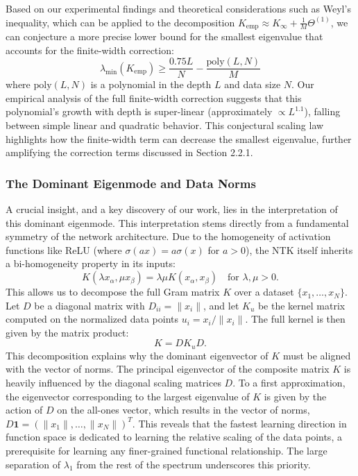 \documentclass{article}
\begin{document}
Based on our experimental findings and theoretical considerations such as Weyl's inequality, which can be applied to the decomposition $K_{\text{emp}} \approx K_\infty + \frac{1}{M}\Theta^{(1)}$, we can conjecture a more precise lower bound for the smallest eigenvalue that accounts for the finite-width correction:
\begin{equation}
\lambda_{\min}(K_{\text{emp}}) \ge \frac{0.75L}{N} - \frac{\text{poly}(L,N)}{M}
\label{eq:lambda_min_conjecture}
\end{equation}
where $\text{poly}(L,N)$ is a polynomial in the depth $L$ and data size $N$. Our empirical analysis of the full finite-width correction suggests that this polynomial's growth with depth is super-linear (approximately $\propto L^{1.1}$), falling between simple linear and quadratic behavior. This conjectural scaling law highlights how the finite-width term can decrease the smallest eigenvalue, further amplifying the correction terms discussed in Section 2.2.1.

\subsubsection{The Dominant Eigenmode and Data Norms}
A crucial insight, and a key discovery of our work, lies in the interpretation of this dominant eigenmode. This interpretation stems directly from a fundamental symmetry of the network architecture. Due to the homogeneity of activation functions like ReLU (where $\sigma(ax) = a\sigma(x)$ for $a>0$), the NTK itself inherits a bi-homogeneity property in its inputs:
\begin{equation}
K( \lambda x_\alpha, \mu x_\beta ) = \lambda \mu K( x_\alpha, x_\beta ) \quad \text{for } \lambda, \mu > 0.
\end{equation}
This allows us to decompose the full Gram matrix $K$ over a dataset $\{x_1, \dots, x_N\}$. Let $D$ be a diagonal matrix with $D_{ii} = \|x_i\|$, and let $K_u$ be the kernel matrix computed on the normalized data points $u_i = x_i / \|x_i\|$. The full kernel is then given by the matrix product:
\begin{equation}
K = D K_u D.
\label{eq:k_decomposition}
\end{equation}
This decomposition explains why the dominant eigenvector of $K$ must be aligned with the vector of norms. The principal eigenvector of the composite matrix $K$ is heavily influenced by the diagonal scaling matrices $D$. To a first approximation, the eigenvector corresponding to the largest eigenvalue of $K$ is given by the action of $D$ on the all-ones vector, which results in the vector of norms, $D\mathbf{1} = (\|x_1\|, \dots, \|x_N\|)^T$. This reveals that the fastest learning direction in function space is dedicated to learning the relative scaling of the data points, a prerequisite for learning any finer-grained functional relationship. The large separation of $\lambda_1$ from the rest of the spectrum underscores this priority.
\end{document}
